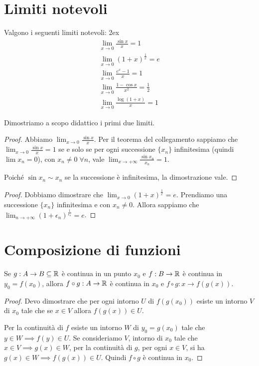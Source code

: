 \section{Limiti notevoli}

\begin{theorem}
Valgono i seguenti limiti notevoli:
\openup 2ex
\begin{gather*}
\lim_{x \to 0} \frac{\sin x }{x} = 1 \\
\lim_{x \to 0} (1+x)^\frac{1}{x} = e \\
\lim_{x \to 0} \frac{e^x-1}{x} = 1 \\
\lim_{x \to 0} \frac{1-\cos x}{x^2} = \frac{1}{2} \\
\lim_{x \to 0} \frac{\log (1+x)}{x} = 1
\end{gather*}
\end{theorem}

Dimostriamo a scopo didattico i primi due limiti.

\begin{proof}
Abbiamo $\lim_{x \to 0} \frac{\sin x}{x}$. Per il teorema del collegamento sappiamo che $\lim_{x \to 0} \frac{\sin x}{x} = 1$ se e solo se per ogni successione $\{x_n\}$ infinitesima (quindi $\lim x_n = 0$), con $x_n \neq 0 \; \forall n$, vale $\lim_{x \to +\infty} \frac{\sin x_n}{x_n} = 1$.

Poiché $\sin x_n \sim x_n$ se la successione è infinitesima, la dimostrazione vale.
\end{proof}

\begin{proof}
Dobbiamo dimostrare che $\lim_{x \to 0} (1+x)^\frac{1}{x} = e$. Prendiamo una successione $\{x_n\}$ infinitesima e con $x_n \neq 0$. Allora sappiamo che $\lim_{n \to +\infty} (1 + \epsilon_n)^\frac{1}{\epsilon_n} = e$.
\end{proof}

\section{Composizione di funzioni}
\begin{proposition}
Se $g: A \to B \subseteq \mathbb R$ è continua in un punto $x_0$ e $f: B \to \mathbb R$ è continua in $y_0 = f(x_0)$, allora $f \circ g: A \to \mathbb R$ è continua in $x_0$ e $f \circ g: x \to f(g(x))$.
\end{proposition}

\begin{proof}
Devo dimostrare che per ogni intorno $U$ di $f(g(x_0))$ esiste un intorno $V$ di $x_0$ tale che se $x \in V$ allora $f(g(x)) \in U$.

Per la continuità di $f$ esiste un intorno $W$ di $y_0 = g(x_0)$ tale che $y \in W \implies f(y) \in U$. Se consideriamo $V$, intorno di $x_0$ tale che $x \in V \implies g(x) \in W$, per la continuità di $g$, per ogni $x \in V$, si ha $g(x) \in W \implies f(g(x)) \in U$. Quindi $f \circ g$ è continua in $x_0$.
\end{proof}

